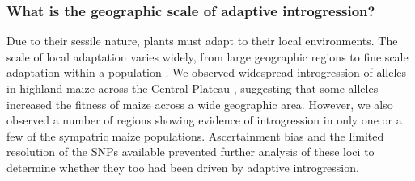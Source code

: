 \subsubsection{What is the geographic scale of adaptive introgression?}
\label{sss:scale}

Due to their sessile nature, plants must adapt to their local environments. 
The scale of local adaptation varies widely, from large geographic regions \citep{lowry2010, fang2014} to fine scale adaptation within a population \citep{hamrick1979}.  
We observed widespread introgression of \zm{} alleles in highland maize across the Central Plateau \citep{Hufford2013}, suggesting that some \zm{} alleles increased the fitness of maize across a wide geographic area.  
However, we also observed a number of regions showing evidence of introgression in only one or a few of the sympatric maize populations. 
Ascertainment bias and the limited resolution of the SNPs available prevented further analysis of these loci to determine whether they too had been driven by adaptive introgression.

